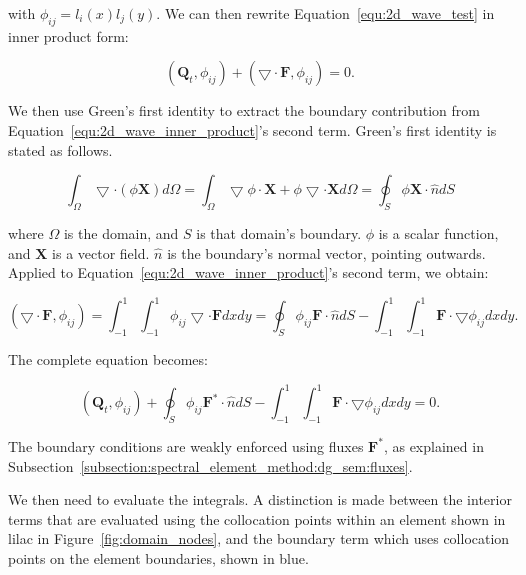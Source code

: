 \noindent
with \(\phi_{i j} = l_i(x)l_j(y)\). We can then rewrite Equation~\ref{equ:2d_wave_test} in inner
product form: 

\begin{equation} \label{equ:2d_wave_inner_product}
	\left( \mathbf{Q}_t, \phi_{i j} \right) + \left( \bigtriangledown \cdot \mathbf{F}, \phi_{i j} \right) = 0.
\end{equation}

We then use Green's first identity to extract the boundary contribution from
Equation~\ref{equ:2d_wave_inner_product}'s second term. Green's first identity is stated as follows.

\begin{equation}
    \int_{\Omega} \bigtriangledown \cdot \left( \phi \mathbf{X} \right) d\Omega  = 
    \int_{\Omega} \bigtriangledown \phi \cdot \mathbf{X} + \phi \bigtriangledown \cdot \mathbf{X} d\Omega = \oint _{S} \phi \mathbf{X} \cdot \widehat{n} dS
\end{equation}

\noindent
where \(\Omega \) is the domain, and \(S\) is that domain's boundary. \(\phi \) is a scalar
function, and \(\mathbf{X}\) is a vector field. \(\widehat{n}\) is the boundary's normal vector,
pointing outwards. Applied to Equation~\ref{equ:2d_wave_inner_product}'s second term, we obtain:

\begin{equation} \label{equ:flux_green}
    \left( \bigtriangledown \cdot \mathbf{F}, \phi_{i j} \right) = \int_{-1}^{1}\int_{-1}^{1}\phi_{i j} \bigtriangledown \cdot \mathbf{F} dx dy = \oint_{S}\phi_{i j} \mathbf{F} \cdot \widehat{n}dS - \int_{-1}^{1}\int_{-1}^{1} \mathbf{F} \cdot \bigtriangledown \phi_{i j} dx dy.
\end{equation}

\noindent
The complete equation becomes:

\begin{equation} \label{equ:integral_equ}
    \left( \mathbf{Q}_t, \phi_{i j} \right) + \oint_{S}\phi_{i j} \mathbf{F}^* \cdot \widehat{n}dS - \int_{-1}^{1}\int_{-1}^{1} \mathbf{F} \cdot \bigtriangledown \phi_{i j} dx dy = 0.
\end{equation}

\noindent
The boundary conditions are weakly enforced using fluxes \(\mathbf{F}^*\), as explained in
Subsection~\ref{subsection:spectral_element_method:dg_sem:fluxes}. 

We then need to evaluate the integrals. A distinction is made between the interior terms that are
evaluated using the collocation points within an element shown in lilac in
Figure~\ref{fig:domain_nodes}, and the boundary term which uses collocation points on the element
boundaries, shown in blue.

